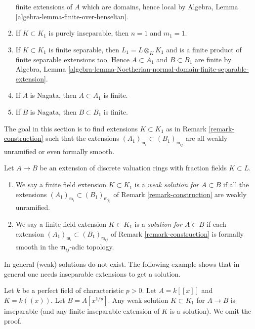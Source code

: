 \begin{remark}
\begin{enumerate}
finite extensions of $A$ which are domains, hence local
by Algebra, Lemma \ref{algebra-lemma-finite-over-henselian}.
\item If $K \subset K_1$ is purely inseparable, then $n =  1$ and
$m_1 = 1$.
\item If $K \subset K_1$ is finite separable, then $L_1 = L \otimes_K K_1$
and is a finite product of finite separable extensions too. Hence
$A \subset A_1$ and $B \subset B_1$ are finite by
Algebra, Lemma
\ref{algebra-lemma-Noetherian-normal-domain-finite-separable-extension}.
\item If $A$ is Nagata, then $A \subset A_1$ is finite.
\item If $B$ is Nagata, then $B \subset B_1$ is finite.
\end{enumerate}
\end{remark}

\noindent
The goal in this section is to find extensions $K \subset K_1$ as in
Remark \ref{remark-construction} such that the extensions
$(A_1)_{\mathfrak m_i} \subset (B_1)_{\mathfrak m_{ij}}$ are
all weakly unramified or even formally smooth.

\begin{definition}
\label{definition-solution}
Let $A \to B$ be an extension of discrete valuation rings with fraction
fields $K \subset L$.
\begin{enumerate}
\item We say a finite field extension $K \subset K_1$ is a
{\it weak solution for $A \subset B$} if all the extensions
$(A_1)_{\mathfrak m_i} \subset (B_1)_{\mathfrak m_{ij}}$ of
Remark \ref{remark-construction} are weakly unramified.
\item We say a finite field extension $K \subset K_1$ is a
{\it solution for $A \subset B$} if each extension
$(A_1)_{\mathfrak m_i} \subset (B_1)_{\mathfrak m_{ij}}$ of
Remark \ref{remark-construction} is formally smooth in
the $\mathfrak m_{ij}$-adic topology.
\end{enumerate}
\end{definition}

\noindent
In general (weak) solutions do not exist. The following example shows that
in general one needs inseparable extensions to get a solution.

\begin{example}
\label{example-inseparable-necessary}
Let $k$ be a perfect field of characteristic $p > 0$. Let $A = k[[x]]$
and $K = k((x))$. Let $B = A[x^{1/p}]$. Any weak solution $K \subset K_1$
for $A \to B$ is inseparable (and any finite inseparable extension of
$K$ is a solution). We omit the proof.
\end{example}

